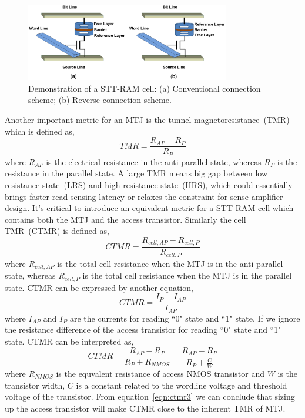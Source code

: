 \begin{figure}[t]
  \centering
  \includegraphics[width=3.5in]{fig/sttramcell.eps}
  \vspace{-10pt}
  \caption{Demonstration of a STT-RAM cell: (a) Conventional connection scheme; (b) Reverse connection scheme.}
  \label{fig:sttcell}
  \vspace{-15pt}
\end{figure}

Another important metric for an MTJ is the tunnel magnetoresistance~(TMR) which is defined as,
\begin{equation}
TMR = \frac{R_{AP}-R_{P}}{R_{P}}
\label{eqn:tmr}
\end{equation}
where ${R_{AP}}$ is the electrical resistance in the anti-parallel state, whereas ${R_{P}}$ is the resistance in the parallel state. A large TMR means big gap between low resistance state~(LRS) and high resistance state~(HRS), which could essentially brings faster read sensing latency or relaxes the constraint for sense amplifier design. It's critical to introduce an equivalent metric for a STT-RAM cell which contains both the MTJ and the access transistor. Similarly the cell TMR~(CTMR) is defined as,
\begin{equation}
CTMR = \frac{R_{cell,AP}-R_{cell,P}}{R_{cell,P}}
\label{eqn:ctmr}
\end{equation}
where $R_{cell,AP}$ is the total cell resistance when the MTJ is in the anti-parallel state, whereas $R_{cell,P}$ is the total cell resistance when the MTJ is in the parallel state. CTMR can be expressed by another equation,
\begin{equation}
CTMR = \frac{I_{P}-I_{AP}}{I_{AP}}
\label{eqn:ctmr2}
\end{equation}
where ${I_{AP}}$ and ${I_{P}}$ are the currents for reading ``0" state and ``1" state. If we ignore the resistance difference of the access transistor for reading ``0" state and ``1" state. CTMR can be interpreted as,
\begin{equation}
CTMR = \frac{R_{AP}-R_{P}}{R_{P}+R_{NMOS}} = \frac{R_{AP}-R_{P}}{R_{P}+\frac{C}{W}}
\label{eqn:ctmr3}
\end{equation}
where $R_{NMOS}$ is the equvalent resistance of access NMOS transistor and $W$ is the transistor width, $C$ is a constant related to the wordline voltage and threshold voltage of the transistor. From equation~\ref{eqn:ctmr3} we can conclude that sizing up the access transistor will make CTMR close to the inherent TMR of MTJ.

